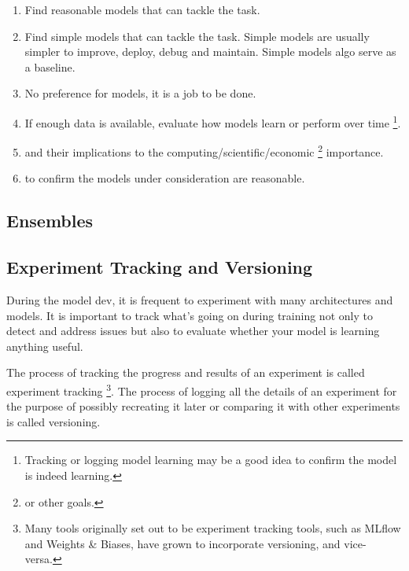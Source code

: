 \begin{enumerate}
    \item {} Find 
    reasonable models that can tackle the task.

    \item {} Find  simple models
    that can tackle the task. Simple models are usually
    simpler to improve, deploy, debug and maintain.
    Simple models algo serve as a baseline.

    \item {} No preference for
    models, it is a job to be done.

    \item {} If enough data
    is available, evaluate how models learn or perform over
    time
    \footnote{
        Tracking or logging model learning may be a good idea
        to confirm the model is indeed learning.
    }.

    \item {} and their implications
    to the computing/scientific/economic
    \footnote{
        or other goals.
    } importance.

    \item {} to confirm the
    models under consideration are reasonable.

\end{enumerate}



\subsection{Ensembles}




\subsection{Experiment Tracking and Versioning}
During the model dev, it is frequent to experiment with many
architectures and models. It is important to track what's
going on during training not only to detect and address
issues but also to evaluate whether your model is learning
anything useful.

The process of tracking the progress
and results of an experiment is called experiment tracking
\footnote{
    Many tools originally set out to be experiment tracking
    tools, such as MLflow and Weights & Biases, have grown
    to incorporate versioning, and vice-versa.
}.
The process of logging all the details of an experiment for
the purpose of possibly recreating it later or comparing it
with other experiments is called versioning.




